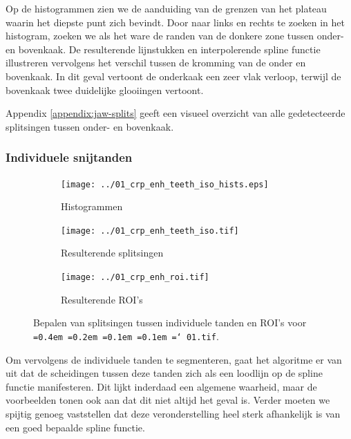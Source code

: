 \documentclass[10pt,a4paper]{article}
\newcommand*\justify{%
  \fontdimen2\font=0.4em%
  \fontdimen3\font=0.2em%
  \fontdimen4\font=0.1em%
  \fontdimen7\font=0.1em%
  \hyphenchar\font=`\-%
}
\newcommand{\ttt}[1]{{\tt \justify{#1}}}
\begin{document}
Op de histogrammen zien we de aanduiding van de grenzen van het plateau waarin het diepste punt zich bevindt. Door naar links en rechts te zoeken in het histogram, zoeken we als het ware de randen van de donkere zone tussen onder- en bovenkaak. De resulterende lijnstukken en interpolerende spline functie illustreren vervolgens het verschil tussen de kromming van de onder en bovenkaak. In dit geval vertoont de onderkaak een zeer vlak verloop, terwijl de bovenkaak twee duidelijke glooiingen vertoont.

Appendix \ref{appendix:jaw-splits} geeft een visueel overzicht van alle gedetecteerde splitsingen tussen onder- en bovenkaak.

\subsubsection*{Individuele snijtanden}

\begin{figure}
\centering
\begin{subfigure}{.49\textwidth}
  \centering
  \texttt{[image: ../01\_crp\_enh\_teeth\_iso\_hists.eps]}
  \caption{Histogrammen}
  \label{fig:teeth_iso_histograms}
\end{subfigure}
\begin{subfigure}{.49\textwidth}
  \centering
  \vspace{3mm}
  \hspace{3mm}
  \texttt{[image: ../01\_crp\_enh\_teeth\_iso.tif]}
  \caption{Resulterende splitsingen}
  \label{fig:teeth_iso_splits}
\end{subfigure}
\begin{subfigure}{.49\textwidth}
  \centering
  \vspace{3mm}
  \hspace{3mm}
  \texttt{[image: ../01\_crp\_enh\_roi.tif]}
  \caption{Resulterende ROI's}
  \label{fig:teeth_iso_roi}
\end{subfigure}
\caption{Bepalen van splitsingen tussen individuele tanden en ROI's voor \ttt{01.tif}.}
\label{fig:teeth_iso}
\vspace{-1cm}
\end{figure}

Om vervolgens de individuele tanden te segmenteren, gaat het algoritme er van uit dat de scheidingen tussen deze tanden zich als een loodlijn op de spline functie manifesteren. Dit lijkt inderdaad een algemene waarheid, maar de voorbeelden tonen ook aan dat dit niet altijd het geval is. Verder moeten we spijtig genoeg vaststellen dat deze veronderstelling heel sterk afhankelijk is van een goed bepaalde spline functie.
\end{document}
